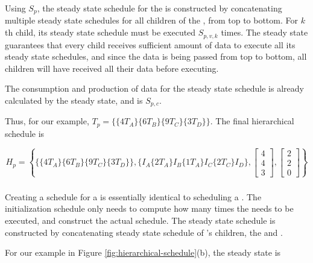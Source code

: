 Using $S_p$, the steady state schedule for the {\pipeline} is
constructed by concatenating multiple steady state schedules for
all children of the {\pipeline}, from top to bottom.  For $k$th
child, its steady state schedule must be executed $S_{p,v,k}$
times.  The steady state guarantees that every child receives
sufficient amount of data to execute all its steady state
schedules, and since the data is being passed from top to bottom,
all children will have received all their data before executing.

The consumption and production of data for the steady state
schedule is already calculated by the steady state, and is
$S_{p,c}$.

Thus, for our example, $T_p = \{\{4T_A\} \{6T_B\} \{9T_C\}
\{3T_D\}\}$.  The final hierarchical schedule is

\begin{displaymath}
H_p = \left\{\{\{4T_A\} \{6T_B\} \{9T_C\}
\{3T_D\}\},\{I_{A}\{2T_{A}\} I_{B}\{1T_{A}\} I_{C}\{2T_{C}\}
I_{D}\}, \left[
\begin{array}{c}
4\\4\\3
\end{array}\right], \left[
\begin{array}{c}
2\\2\\0
\end{array}\right] \right\}
\end{displaymath}

\subsubsection{\splitjoins}

Creating a schedule for a {\splitjoin} is essentially identical to
scheduling a {\pipeline}.  The initialization schedule only needs to
compute how many times the {\splitter} needs to be executed, and
construct the actual schedule.  The steady state schedule is
constructed by concatenating steady state schedule of {\splitjoin}'s
children, the {\splitter} and {\joiner}.

For our example in Figure \ref{fig:hierarchical-schedule}(b), the
steady state is

